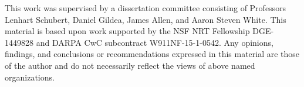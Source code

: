 \begin{contributors}

This work was supervised by a dissertation committee consisting of Professors Lenhart Schubert, Daniel Gildea, James Allen, and Aaron Steven White.
This material is based upon work supported by the NSF NRT Fellowship DGE-1449828 and DARPA CwC subcontract W911NF-15-1-0542.  Any opinions, findings, and conclusions or recommendations
expressed in this material are those of the author and do not necessarily reflect the views of above named organizations.
\end{contributors}